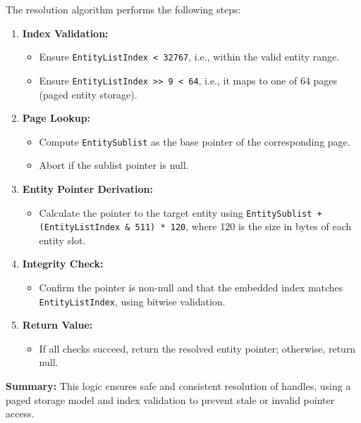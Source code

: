 \noindent The resolution algorithm performs the following steps:

\begin{enumerate}
    \item \textbf{Index Validation:}
    \begin{itemize}
        \item Ensure \texttt{EntityListIndex < 32767}, i.e., within the valid entity range.
        \item Ensure \texttt{EntityListIndex >> 9 < 64}, i.e., it maps to one of 64 pages (paged entity storage).
    \end{itemize}

    \item \textbf{Page Lookup:}
    \begin{itemize}
        \item Compute \texttt{EntitySublist} as the base pointer of the corresponding page.
        \item Abort if the sublist pointer is null.
    \end{itemize}

    \item \textbf{Entity Pointer Derivation:}
    \begin{itemize}
        \item Calculate the pointer to the target entity using \texttt{EntitySublist + (EntityListIndex \& 511) * 120}, where 120 is the size in bytes of each entity slot.
    \end{itemize}

    \item \textbf{Integrity Check:}
    \begin{itemize}
        \item Confirm the pointer is non-null and that the embedded index matches \texttt{EntityListIndex}, using bitwise validation.
    \end{itemize}

    \item \textbf{Return Value:}
    \begin{itemize}
        \item If all checks succeed, return the resolved entity pointer; otherwise, return null.
    \end{itemize}
\end{enumerate}

\vspace{0.5em}
\begin{tcolorbox}[colback=gray!05, colframe=black!15, sharp corners, boxrule=0pt]
\textbf{Summary:}  
This logic ensures safe and consistent resolution of handles, using a paged storage model and index validation to prevent stale or invalid pointer access.
\end{tcolorbox}
